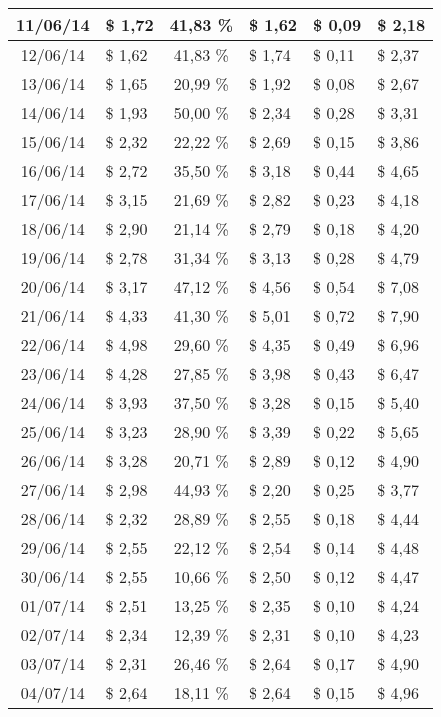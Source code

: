 \begin{center}
\begin{small}
\begin{longtable}{|c|l|c|l|l|l|}
11/06/14 & \$ 1,72 & 41,83 \% & \$ 1,62 & \$ 0,09 & \$ 2,18 \\ \hline
12/06/14 & \$ 1,62 & 41,83 \% & \$ 1,74 & \$ 0,11 & \$ 2,37 \\ \hline
13/06/14 & \$ 1,65 & 20,99 \% & \$ 1,92 & \$ 0,08 & \$ 2,67 \\ \hline
14/06/14 & \$ 1,93 & 50,00 \% & \$ 2,34 & \$ 0,28 & \$ 3,31 \\ \hline
15/06/14 & \$ 2,32 & 22,22 \% & \$ 2,69 & \$ 0,15 & \$ 3,86 \\ \hline
16/06/14 & \$ 2,72 & 35,50 \% & \$ 3,18 & \$ 0,44 & \$ 4,65 \\ \hline
17/06/14 & \$ 3,15 & 21,69 \% & \$ 2,82 & \$ 0,23 & \$ 4,18 \\ \hline
18/06/14 & \$ 2,90 & 21,14 \% & \$ 2,79 & \$ 0,18 & \$ 4,20 \\ \hline
19/06/14 & \$ 2,78 & 31,34 \% & \$ 3,13 & \$ 0,28 & \$ 4,79 \\ \hline
20/06/14 & \$ 3,17 & 47,12 \% & \$ 4,56 & \$ 0,54 & \$ 7,08 \\ \hline
21/06/14 & \$ 4,33 & 41,30 \% & \$ 5,01 & \$ 0,72 & \$ 7,90 \\ \hline
22/06/14 & \$ 4,98 & 29,60 \% & \$ 4,35 & \$ 0,49 & \$ 6,96 \\ \hline
23/06/14 & \$ 4,28 & 27,85 \% & \$ 3,98 & \$ 0,43 & \$ 6,47 \\ \hline
24/06/14 & \$ 3,93 & 37,50 \% & \$ 3,28 & \$ 0,15 & \$ 5,40 \\ \hline
25/06/14 & \$ 3,23 & 28,90 \% & \$ 3,39 & \$ 0,22 & \$ 5,65 \\ \hline
26/06/14 & \$ 3,28 & 20,71 \% & \$ 2,89 & \$ 0,12 & \$ 4,90 \\ \hline
27/06/14 & \$ 2,98 & 44,93 \% & \$ 2,20 & \$ 0,25 & \$ 3,77 \\ \hline
28/06/14 & \$ 2,32 & 28,89 \% & \$ 2,55 & \$ 0,18 & \$ 4,44 \\ \hline
29/06/14 & \$ 2,55 & 22,12 \% & \$ 2,54 & \$ 0,14 & \$ 4,48 \\ \hline
30/06/14 & \$ 2,55 & 10,66 \% & \$ 2,50 & \$ 0,12 & \$ 4,47 \\ \hline
01/07/14 & \$ 2,51 & 13,25 \% & \$ 2,35 & \$ 0,10 & \$ 4,24 \\ \hline
02/07/14 & \$ 2,34 & 12,39 \% & \$ 2,31 & \$ 0,10 & \$ 4,23 \\ \hline
03/07/14 & \$ 2,31 & 26,46 \% & \$ 2,64 & \$ 0,17 & \$ 4,90 \\ \hline
04/07/14 & \$ 2,64 & 18,11 \% & \$ 2,64 & \$ 0,15 & \$ 4,96 \\ \hline

\end{longtable}
\end{small}
\end{center}
